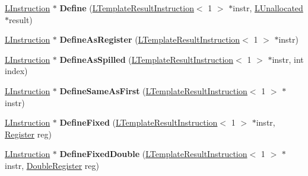 \begin{DoxyCompactItemize}
\item 
\hyperlink{classv8_1_1internal_1_1_l_instruction}{L\+Instruction} $\ast$ {\bfseries Define} (\hyperlink{classv8_1_1internal_1_1_l_template_result_instruction}{L\+Template\+Result\+Instruction}$<$ 1 $>$ $\ast$instr, \hyperlink{classv8_1_1internal_1_1_l_unallocated}{L\+Unallocated} $\ast$result)\hypertarget{classv8_1_1internal_1_1_l_chunk_builder_afd009a30c72fe37dd1b35d4241854ca0}{}\label{classv8_1_1internal_1_1_l_chunk_builder_afd009a30c72fe37dd1b35d4241854ca0}

\item 
\hyperlink{classv8_1_1internal_1_1_l_instruction}{L\+Instruction} $\ast$ {\bfseries Define\+As\+Register} (\hyperlink{classv8_1_1internal_1_1_l_template_result_instruction}{L\+Template\+Result\+Instruction}$<$ 1 $>$ $\ast$instr)\hypertarget{classv8_1_1internal_1_1_l_chunk_builder_af4f9a5078553b1f743899df249a25b31}{}\label{classv8_1_1internal_1_1_l_chunk_builder_af4f9a5078553b1f743899df249a25b31}

\item 
\hyperlink{classv8_1_1internal_1_1_l_instruction}{L\+Instruction} $\ast$ {\bfseries Define\+As\+Spilled} (\hyperlink{classv8_1_1internal_1_1_l_template_result_instruction}{L\+Template\+Result\+Instruction}$<$ 1 $>$ $\ast$instr, int index)\hypertarget{classv8_1_1internal_1_1_l_chunk_builder_a4e42c6b4bb935cc879f078e349ee6a1d}{}\label{classv8_1_1internal_1_1_l_chunk_builder_a4e42c6b4bb935cc879f078e349ee6a1d}

\item 
\hyperlink{classv8_1_1internal_1_1_l_instruction}{L\+Instruction} $\ast$ {\bfseries Define\+Same\+As\+First} (\hyperlink{classv8_1_1internal_1_1_l_template_result_instruction}{L\+Template\+Result\+Instruction}$<$ 1 $>$ $\ast$instr)\hypertarget{classv8_1_1internal_1_1_l_chunk_builder_a7a3e6bb64466e8d0b7062311bc13455a}{}\label{classv8_1_1internal_1_1_l_chunk_builder_a7a3e6bb64466e8d0b7062311bc13455a}

\item 
\hyperlink{classv8_1_1internal_1_1_l_instruction}{L\+Instruction} $\ast$ {\bfseries Define\+Fixed} (\hyperlink{classv8_1_1internal_1_1_l_template_result_instruction}{L\+Template\+Result\+Instruction}$<$ 1 $>$ $\ast$instr, \hyperlink{structv8_1_1internal_1_1_register}{Register} reg)\hypertarget{classv8_1_1internal_1_1_l_chunk_builder_a7dfb72b4e8c8ed4fc4acb6c8ce207af9}{}\label{classv8_1_1internal_1_1_l_chunk_builder_a7dfb72b4e8c8ed4fc4acb6c8ce207af9}

\item 
\hyperlink{classv8_1_1internal_1_1_l_instruction}{L\+Instruction} $\ast$ {\bfseries Define\+Fixed\+Double} (\hyperlink{classv8_1_1internal_1_1_l_template_result_instruction}{L\+Template\+Result\+Instruction}$<$ 1 $>$ $\ast$instr, \hyperlink{structv8_1_1internal_1_1_double_register}{Double\+Register} reg)\hypertarget{classv8_1_1internal_1_1_l_chunk_builder_aa9504301e737cc0e32d8dabaa2583e90}{}\label{classv8_1_1internal_1_1_l_chunk_builder_aa9504301e737cc0e32d8dabaa2583e90}


\end{DoxyCompactItemize}
